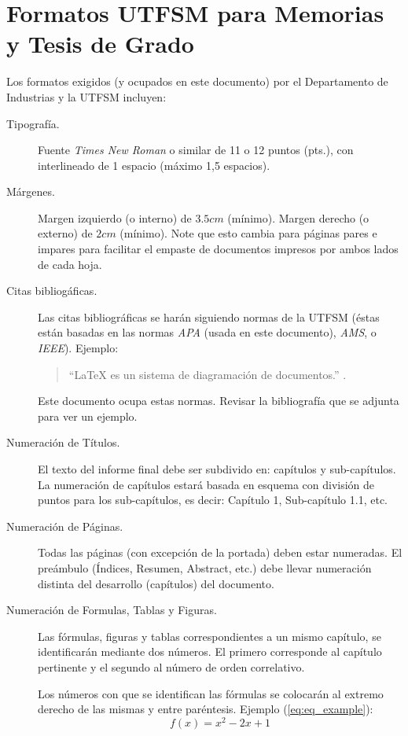 
\chapter{Formatos UTFSM para Memorias y Tesis de Grado }

Los formatos exigidos (y ocupados en este documento) por el Departamento de Industrias y la UTFSM incluyen:

\begin{description}
\item[Tipografía.] Fuente \emph{Times New Roman} o similar de 11 o 12 puntos (pts.), con interlineado de 1 espacio (máximo 1,5 espacios).
\item[Márgenes.] Margen izquierdo (o interno) de $3.5cm$ (mínimo). Margen derecho (o externo) de $2cm$ (mínimo). Note que esto cambia para páginas pares e impares para facilitar el empaste de documentos impresos por ambos lados de cada hoja.
\item[Citas bibliogáficas.] Las citas bibliográficas se harán siguiendo normas de la UTFSM (éstas están basadas en las normas \emph{APA} (usada en este documento), \emph{AMS}, o \emph{IEEE}). Ejemplo:

\begin{quote}
    ``\LaTeX{} es un sistema de diagramación de documentos.'' \citep{Lamport94}.
\end{quote}

Este documento ocupa estas normas. Revisar la bibliografía que se adjunta para ver un ejemplo.

\item[Numeración de Títulos.] El texto del informe final debe ser subdivido en: capítulos y sub-capítulos. La numeración de capítulos estará basada en esquema con división de puntos para los sub-capítulos, es decir: Capítulo 1, Sub-capítulo 1.1, etc.
\item[Numeración de Páginas.] Todas las páginas (con excepción de la portada) deben estar numeradas. El preámbulo (Índices, Resumen, Abstract, etc.) debe llevar numeración distinta del desarrollo (capítulos) del documento.
\item[Numeración de Formulas, Tablas y Figuras.] Las fórmulas, figuras y tablas correspondientes a un mismo capítulo, se identificarán mediante dos números. El primero corresponde al capítulo pertinente y el segundo al número de orden correlativo.


Los números con que se identifican las fórmulas se colocarán al extremo derecho de las mismas y entre paréntesis. Ejemplo (\autoref{eq:eq_example}):
\begin{equation}
f(x) = x^2-2x+1
\label{eq:eq_example}
\end{equation}


\end{description}
